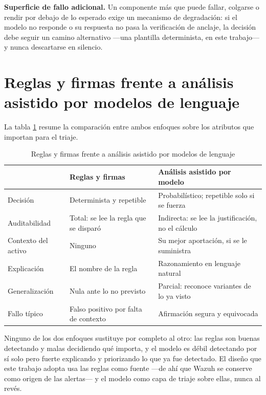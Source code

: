 \textbf{Superficie de fallo adicional.} Un componente más que puede fallar, colgarse o rendir por
debajo de lo esperado exige un mecanismo de degradación: si el modelo no responde o su respuesta no
pasa la verificación de anclaje, la decisión debe seguir un camino alternativo ---una plantilla
determinista, en este trabajo--- y nunca descartarse en silencio.

\section{Reglas y firmas frente a análisis asistido por modelos de lenguaje}

La tabla \ref{tab:reglas-vs-ia} resume la comparación entre ambos enfoques sobre los atributos que
importan para el triaje.

\begin{table}[H]
  \centering
  \caption{Reglas y firmas frente a análisis asistido por modelos de lenguaje}
  \label{tab:reglas-vs-ia}
  \begin{tabular}{@{}p{}p{}p{}@{}}
    \toprule
    & \textbf{Reglas y firmas} & \textbf{Análisis asistido por modelo} \\
    \midrule
    Decisión & Determinista y repetible & Probabilístico; repetible solo si se fuerza \\
    Auditabilidad & Total: se lee la regla que se disparó & Indirecta: se lee la justificación, no
      el cálculo \\
    Contexto del activo & Ninguno & Su mejor aportación, si se le suministra \\
    Explicación & El nombre de la regla & Razonamiento en lenguaje natural \\
    Generalización & Nula ante lo no previsto & Parcial: reconoce variantes de lo ya visto \\
    Fallo típico & Falso positivo por falta de contexto & Afirmación segura y equivocada \\
    \bottomrule
  \end{tabular}
\end{table}

Ninguno de los dos enfoques sustituye por completo al otro: las reglas son buenas detectando y
malas decidiendo qué importa, y el modelo es débil detectando por sí solo pero fuerte explicando y
priorizando lo que ya fue detectado. El diseño que este trabajo adopta usa las reglas como fuente
---de ahí que Wazuh se conserve como origen de las alertas--- y el modelo como capa de triaje sobre
ellas, nunca al revés.

